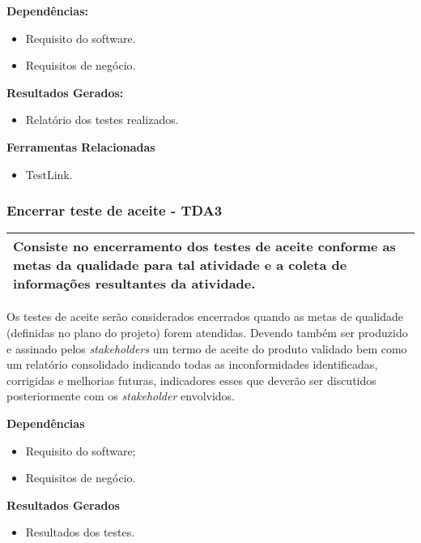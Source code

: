 \textbf{Dependências: }
\begin{itemize}
    \item Requisito do software.
    \item Requisitos de negócio.
\end{itemize}

\textbf{Resultados Gerados: }
\begin{itemize}
    \item Relatório dos testes realizados.  
\end{itemize}

\textbf{Ferramentas Relacionadas }
\begin{itemize}
    \item TestLink. 
\end{itemize}

\subsubsection{Encerrar teste de aceite - TDA3}
\label{sec:tda3}

\begin{table}[!ht]
\centering
\begin{tabular}{|p{130mm}|}
\hline
Consiste no encerramento dos testes de aceite conforme as metas da qualidade para tal atividade e a coleta de informações resultantes da atividade. \\ 
\hline
\end{tabular}
\end{table}

Os testes de aceite serão considerados encerrados quando as metas de qualidade (definidas no plano do projeto) forem atendidas. Devendo também ser produzido e assinado pelos \textit{stakeholders} um termo de aceite do produto validado bem como um relatório consolidado indicando todas as inconformidades identificadas, corrigidas e melhorias futuras, indicadores esses que deverão ser discutidos posteriormente com os \textit{stakeholder} envolvidos.

\textbf{Dependências}
\begin{itemize}
    \item Requisito do software;
    \item Requisitos de negócio.
\end{itemize}

\textbf{Resultados Gerados}
\begin{itemize}
    \item Resultados dos testes.
\end{itemize}

